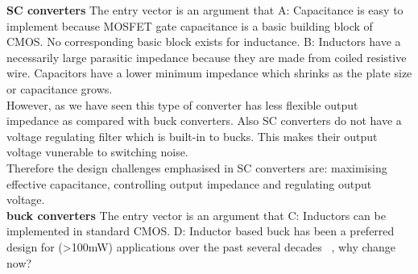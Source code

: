 \documentclass[letterpaper,twocolumn,10pt]{article}
\begin{document}
\indent \textbf{SC converters} The entry vector is an argument that A: Capacitance is easy to implement because MOSFET gate capacitance is a basic building block of CMOS. No corresponding basic block exists for inductance. B: Inductors have a necessarily large parasitic impedance because they are made from coiled resistive wire. Capacitors have a lower minimum impedance which shrinks as the plate size or capacitance grows.\\
However, as we have seen this type of converter has less flexible output impedance as compared with buck converters. Also SC converters do not have a voltage regulating filter which is built-in to bucks. This makes their output voltage vunerable to switching noise.\\
Therefore the design challenges emphasised in SC converters are: maximising effective capacitance, controlling output impedance and regulating output voltage.\\ 
\indent \textbf{buck converters} The entry vector is an argument that C: Inductors can be implemented in standard CMOS. D: Inductor based buck has been a preferred design for (>100mW) applications over the past several decades ~\cite{Sanders2010}, why change now?

\end{document}
